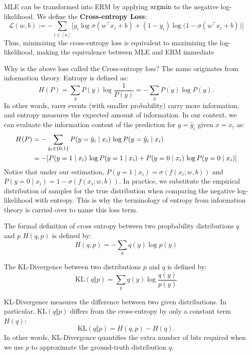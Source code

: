 \documentclass[../main]{subfiles}
\begin{document}
MLE can be transformed into ERM by applying $\mathop{\mathrm{argmin}}$ to the negative log-likelihood. We define the \textbf{Cross-entropy Loss}:
\begin{equation}
    \mathcal{L}(w,b) 
    := - \sum_{i \in [n]} \Big[ 
      y_i \log \sigma(w^\top x_i + b) 
      + (1-y_i) \log \big(1 - \sigma(w^\top x_i + b)\big) 
    \Big]
\end{equation}
Thus, minimizing the cross-entropy loss is equivalent to maximizing the log-likelihood, making the equivalence between MLE and ERM immediate
\begin{note}
  Why is the above loss called the {Cross-entropy loss}? 
  The name originates from information theory. 
  Entropy is defined as:
  \begin{equation}
      H(P) = \sum_y P(y)\log\frac{1}{P(y)} 
           = -\sum_y P(y)\log P(y).
  \end{equation}
  In other words, rarer events (with smaller probability) carry more information, 
  and entropy measures the expected amount of information. In our context, we can evaluate the information content of the prediction 
  for $y = \hat y_i$ given $x = x_i$ as:
  \begin{align}
      H(P) &= - \sum_{\hat y_i \in \{0,1\}} 
      P(y=\hat y_i \mid x_i)\,\log P(y=\hat y_i \mid x_i)\notag\\
      &=-[P(y=1\mid x_i)\,\log P(y=1\mid x_i)+P(y=0 \mid x_i)\,\log P(y=0 \mid x_i)]
  \end{align}
  Notice that under our estimation, $P(y=1 \mid x_i) = \sigma(f(x_i; w,b))$ and $P(y=0 \mid x_i) = 1 - \sigma(f(x_i; w,b))$. In practice, we substitute the empirical distribution of samples for the true distribution when comparing the negative log-likelihood with entropy. This is why the terminology of entropy from information theory is carried over to name this loss term.
\end{note}
\begin{note}
  The formal definition of cross entropy between two propbability distributions $q$ and $p$ $H(q,p)$ is defined by:
  \begin{equation}
      H(q,p)=-\sum_y q(y)\log p(y)
  \end{equation}
\end{note}
\begin{definition}[KL-Divergence]
  The KL-Divergence between two distributions $p$ and $q$ is defined by:
    \begin{equation}
        \mathrm{KL}(q\Vert p)=\sum_y q(y)\log\frac{q(y)}{p(y)}
    \end{equation}
\end{definition}
KL-Divergence measures the difference between two given distributions. 
In particular, $\mathrm{KL}(q \Vert p)$ differs from the cross-entropy by only a constant term $H(q)$:
\begin{equation}
  \mathrm{KL}(q \Vert p) = H(q, p) - H(q).
\end{equation}
In other words, KL-Divergence quantifies the extra number of bits required when we use $p$ to approximate the ground-truth distribution $q$.
\end{document}
